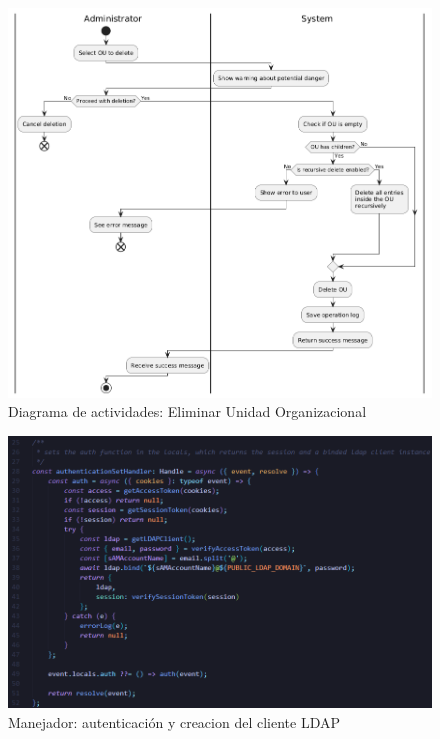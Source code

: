 \begin{figure}[h]
    \centering
    \includegraphics[width=\linewidth]{images/puml/activity-diagram delete ou/activity-diagram delete ou.png}
    \caption{Diagrama de actividades: Eliminar Unidad Organizacional}
    \label{fig:activity-diagram-delete-ou}
\end{figure}
\restoregeometry

\begin{figure}[h]
    \centering
    \includegraphics[width=\textwidth]{images/code/authenticationSetHandler.png}
    \caption{Manejador: autenticación y creacion del cliente LDAP}
    \label{fig:authentication-set-handler}
\end{figure}

